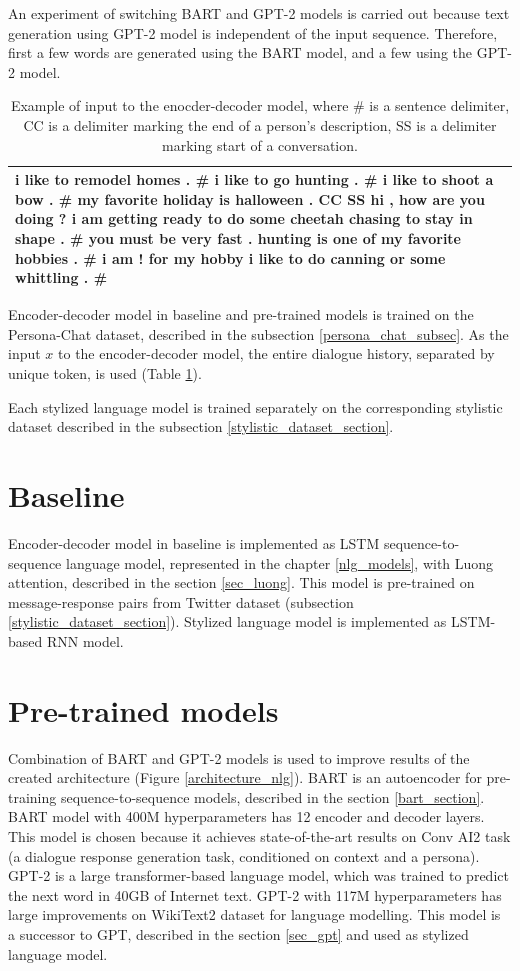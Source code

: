 An experiment of switching BART and GPT-2 models is carried out because text generation using GPT-2 model is independent of the input sequence. Therefore, first a few words are generated using the BART model, and a few using the GPT-2 model. 

\begin{table}[ht]
\centering
 \begin{tabular}{|p{15cm}|} 
 \hline
  i like to remodel homes . \# i like to go hunting . \# i like to shoot a bow . \# my favorite holiday is halloween . CC  SS hi , how are you doing ? i am getting ready to do some cheetah chasing to stay in shape . \# you must be very fast . hunting is one of my favorite hobbies . \# i am ! for my hobby i like to do canning or some whittling . \# \\
 \hline
 \end{tabular}
 \caption{Example of input to the enocder-decoder model, where \# is a sentence delimiter, CC is a delimiter marking the end of a person’s description, SS is a delimiter marking start of a conversation.}
\label{tab:persona_input}
\end{table}

Encoder-decoder model in baseline and pre-trained models is trained on the Persona-Chat dataset, described in the subsection \ref{persona_chat_subsec}. As the input $x$ to the encoder-decoder model, the entire dialogue history, separated by unique token, is used (Table \ref{tab:persona_input}).

Each stylized language model is trained separately on the corresponding stylistic dataset described in the subsection \ref{stylistic_dataset_section}.

\section{Baseline}
Encoder-decoder model in baseline is implemented as LSTM sequence-to-sequence language model, represented in the chapter \ref{nlg_models}, with Luong attention, described in the section \ref{sec_luong}. This model is pre-trained on message-response pairs from Twitter dataset (subsection \ref{stylistic_dataset_section}). Stylized language model is implemented as LSTM-based RNN model.

\section{Pre-trained models}
Combination of BART and GPT-2 models is used to improve results of the created architecture (Figure \ref{architecture_nlg}). BART is an autoencoder for pre-training sequence-to-sequence models, described in the section \ref{bart_section}. BART model with 400M hyperparameters has 12 encoder and decoder layers. This model is chosen because it achieves state-of-the-art results on Conv AI2 task (a dialogue response generation task, conditioned on context and a persona). GPT-2 is a large transformer-based language model, which was trained to predict the next word in 40GB of Internet text. GPT-2 with 117M hyperparameters has large improvements on WikiText2 dataset for language modelling. This model is a successor to GPT, described in the section \ref{sec_gpt} and used as stylized language model. 

